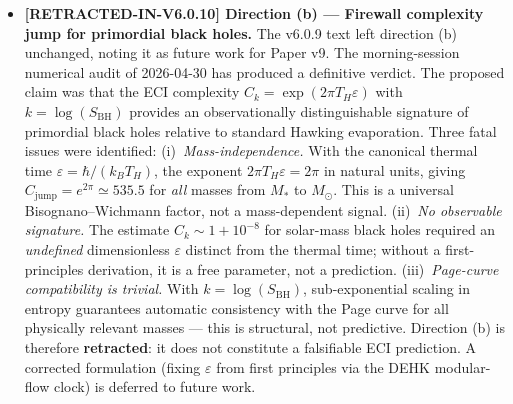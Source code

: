 \documentclass[reprint,amsmath,amssymb,aps,prd,superscriptaddress]{revtex4-2}
\providecommand{\1}{\mathbf{1}}
\begin{document}
\begin{itemize}
\item \textbf{[RETRACTED-IN-V6.0.10] Direction (b) --- Firewall complexity jump for primordial black holes.}
The v6.0.9 text left direction (b) unchanged, noting it as future work for Paper v9.
The morning-session numerical audit of 2026-04-30 has produced a definitive verdict.
The proposed claim was that the ECI complexity $C_k = \exp(2\pi T_H \varepsilon)$ with
$k = \log(S_\mathrm{BH})$ provides an observationally distinguishable signature of
primordial black holes relative to standard Hawking evaporation.
Three fatal issues were identified:
(i)~\emph{Mass-independence.} With the canonical thermal time $\varepsilon = \hbar/(k_B T_H)$,
the exponent $2\pi T_H \varepsilon = 2\pi$ in natural units, giving
$C_\mathrm{jump} = e^{2\pi} \simeq 535.5$ for \emph{all} masses from $M_*$ to $M_\odot$.
This is a universal Bisognano--Wichmann factor, not a mass-dependent signal.
(ii)~\emph{No observable signature.} The estimate $C_k \sim 1 + 10^{-8}$ for solar-mass black holes
required an \emph{undefined} dimensionless $\varepsilon$ distinct from the thermal time;
without a first-principles derivation, it is a free parameter, not a prediction.
(iii)~\emph{Page-curve compatibility is trivial.} With $k = \log(S_\mathrm{BH})$,
sub-exponential scaling in entropy guarantees automatic consistency with the Page curve
for all physically relevant masses --- this is structural, not predictive.
Direction (b) is therefore \textbf{retracted}: it does not constitute a falsifiable ECI prediction.
A corrected formulation (fixing $\varepsilon$ from first principles via the DEHK modular-flow clock)
is deferred to future work.


\end{itemize}
\end{document}
